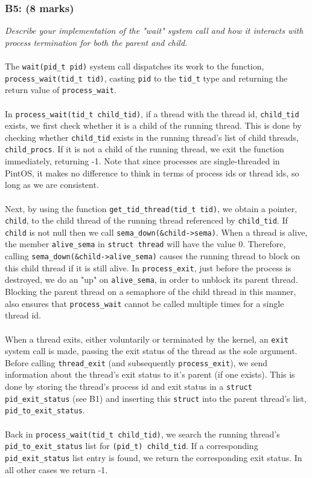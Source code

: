 \documentclass{article}
\begin{document}
\subsubsection*{B5: (8 marks) }
\textit{Describe your implementation of the "wait" system call and how it interacts
with process termination for both the parent and child.}
\\ \\
The \texttt{wait(pid\_t pid)} system call dispatches its work to the function, \texttt{process\_wait(tid\_t tid)}, casting \texttt{pid} to the \texttt{tid\_t} type and returning the return value of \texttt{process\_wait}.
\\ \\
In \texttt{process\_wait(tid\_t child\_tid)}, if a thread with the thread id, \texttt{child\_tid} exists, we first check whether it is a child of the running thread. This is done by checking whether \texttt{child\_tid} exists in the running thread's list of child threads, \texttt{child\_procs}. If it is not a child of the running thread, we exit the function immediately, returning -1. Note that since processes are single-threaded in PintOS, it makes no difference to think in terms of process ids or thread ids, so long as we are consistent.
\\ \\
Next, by using the function \texttt{get\_tid\_thread(tid\_t tid)}, we obtain a pointer, \texttt{child}, to the child thread of the running thread referenced by \texttt{child\_tid}. If \texttt{child} is not null then we call \texttt{sema\_down(\&child->sema)}. When a thread is alive, the member \texttt{alive\_sema} in \texttt{struct thread} will have the value 0. Therefore, calling \texttt{sema\_down(\&child->alive\_sema)} causes the running thread to block on this child thread if it is still alive. In \texttt{process\_exit}, just before the process is destroyed, we do an "up" on \texttt{alive\_sema}, in order to unblock its parent thread. Blocking the parent thread on a semaphore of the child thread in this manner, also ensures that \texttt{process\_wait} cannot be called multiple times for a single thread id.
\\ \\
When a thread exits, either voluntarily or terminated by the kernel, an \texttt{exit} system call is made, passing the exit status of the thread as the sole argument. Before calling \texttt{thread\_exit} (and subsequently \texttt{process\_exit}), we send information about the thread's exit status to it's parent (if one exists). This is done by storing the thread's process id and exit status in a \texttt{struct pid\_exit\_status} (see B1) and inserting this \texttt{struct} into the parent thread's list, \texttt{pid\_to\_exit\_status}.
\\ \\
Back in \texttt{process\_wait(tid\_t child\_tid)}, we search the running thread's \texttt{pid\_to\_exit\_status} list for \texttt{(pid\_t) child\_tid}. If a corresponding \texttt{pid\_exit\_status} list entry is found, we return the corresponding exit status. In all other cases we return -1.
\end{document}
